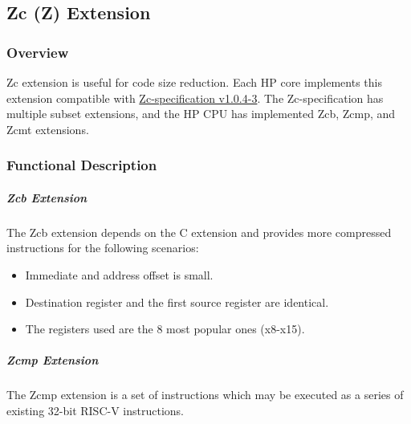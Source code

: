 \documentclass[main\_\_EN.tex]{subfiles}
\begin{document}
\newpage


\newpage
\subsection{Zc (Z) Extension}
\label{sec:riscvcpu-zc}

\subsubsection{Overview}
\label{sec:riscvcpu-zc-overview}

Zc extension is useful for code size reduction. Each HP core implements this extension compatible with \href{https://github.com/riscvarchive/riscv-code-size-reduction/blob/v1.0.4-3/Zc-specification/Zc.adoc}{Zc-specification v1.0.4-3}. The Zc-specification has multiple subset extensions, and the \chipname HP CPU has implemented Zcb, Zcmp, and Zcmt extensions.

\subsubsection{Functional Description}
\label{sec:riscvcpu-zc-func-descr}


\subparagraph{Zcb Extension}

The Zcb extension depends on the C extension and provides more compressed instructions for the following scenarios:

\begin{itemize}
    \item Immediate and address offset is small.
    \item Destination register and the first source register are identical.
    \item The registers used are the 8 most popular ones (x8-x15).
\end{itemize}

\subparagraph{Zcmp Extension}

The Zcmp extension is a set of instructions which may be executed as a series of existing 32-bit RISC-V instructions.
\end{document}
